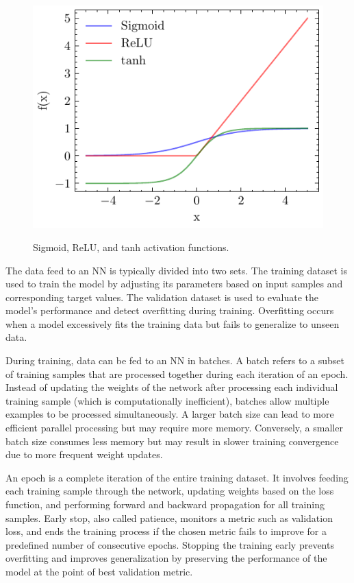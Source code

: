 \documentclass[ppgc,diss,english]{iiufrgs}
\begin{document}
\begin{figure}[tb]
\caption[Common activation functions]{Sigmoid, ReLU, and tanh activation functions.}
\vspace{\baselineskip}
\centering
\includegraphics[scale=1.0]{img/sigmoid-relu-tanh}
\label{fig:activation-functions}
\end{figure}

The data feed to an NN is typically divided into two sets. The training dataset is used to train the model by adjusting its parameters based on input samples and corresponding target values. The validation dataset is used to evaluate the model's performance and detect overfitting during training. Overfitting occurs when a model excessively fits the training data but fails to generalize to unseen data.

During training, data can be fed to an NN in batches. A batch refers to a subset of training samples that are processed together during each iteration of an epoch. Instead of updating the weights of the network after processing each individual training sample (which is computationally inefficient), batches allow multiple examples to be processed simultaneously. A larger batch size can lead to more efficient parallel processing but may require more memory. Conversely, a smaller batch size consumes less memory but may result in slower training convergence due to more frequent weight updates.

An epoch is a complete iteration of the entire training dataset. It involves feeding each training sample through the network, updating weights based on the loss function, and performing forward and backward propagation for all training samples. Early stop, also called patience, monitors a metric such as validation loss, and ends the training process if the chosen metric fails to improve for a predefined number of consecutive epochs. Stopping the training early prevents overfitting and improves generalization by preserving the performance of the model at the point of best validation metric.
\end{document}
